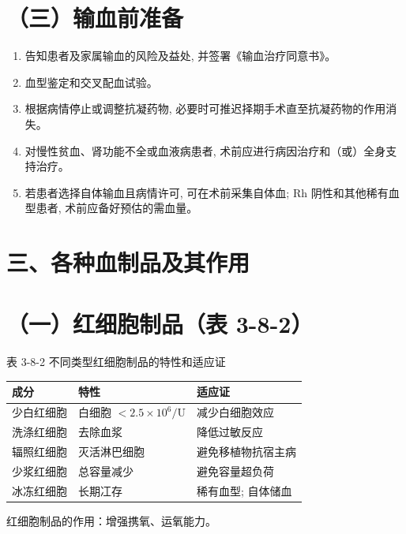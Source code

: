 \documentclass[10pt]{article}
\begin{document}
\section*{（三）输血前准备}
\begin{enumerate}
  \item 告知患者及家属输血的风险及益处, 并签署《输血治疗同意书》。

  \item 血型鉴定和交叉配血试验。

  \item 根据病情停止或调整抗凝药物, 必要时可推迟择期手术直至抗凝药物的作用消失。

  \item 对慢性贫血、肾功能不全或血液病患者, 术前应进行病因治疗和（或）全身支持治疗。

  \item 若患者选择自体输血且病情许可, 可在术前采集自体血; Rh 阴性和其他稀有血型患者, 术前应备好预估的需血量。

\end{enumerate}

\section*{三、各种血制品及其作用}
\section*{（一）红细胞制品（表 3-8-2）}
表 3-8-2 不同类型红细胞制品的特性和适应证

\begin{center}
\begin{tabular}{lll}
\hline
成分 & 特性 & 适应证 \\
\hline
少白红细胞 & 白细胞 $<2.5 \times 10^{6} / \mathrm{U}$ & 减少白细胞效应 \\
洗涤红细胞 & 去除血浆 & 降低过敏反应 \\
辐照红细胞 & 灭活淋巴细胞 & 避免移植物抗宿主病 \\
少浆红细胞 & 总容量减少 & 避免容量超负荷 \\
冰冻红细胞 & 长期冮存 & 稀有血型; 自体储血 \\
\hline
\end{tabular}
\end{center}

红细胞制品的作用：增强携氧、运氧能力。
\end{document}
